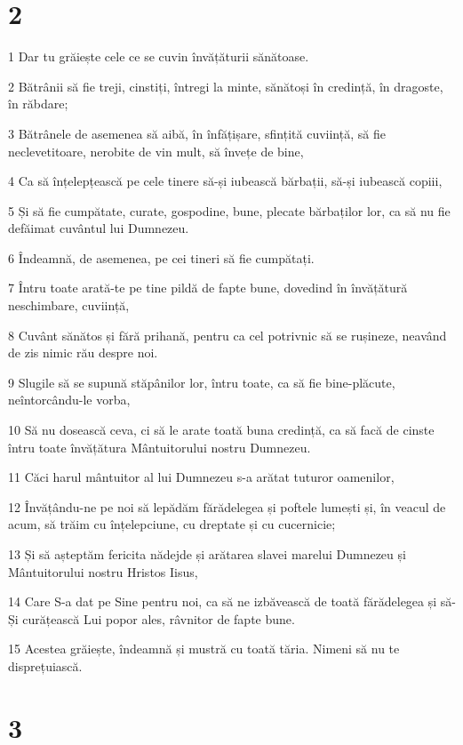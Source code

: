 \chapter{2}

\par 1 Dar tu grăiește cele ce se cuvin învățăturii sănătoase.
\par 2 Bătrânii să fie treji, cinstiți, întregi la minte, sănătoși în credință, în dragoste, în răbdare;
\par 3 Bătrânele de asemenea să aibă, în înfățișare, sfințită cuviință, să fie neclevetitoare, nerobite de vin mult, să învețe de bine,
\par 4 Ca să înțelepțească pe cele tinere să-și iubească bărbații, să-și iubească copiii,
\par 5 Și să fie cumpătate, curate, gospodine, bune, plecate bărbaților lor, ca să nu fie defăimat cuvântul lui Dumnezeu.
\par 6 Îndeamnă, de asemenea, pe cei tineri să fie cumpătați.
\par 7 Întru toate arată-te pe tine pildă de fapte bune, dovedind în învățătură neschimbare, cuviință,
\par 8 Cuvânt sănătos și fără prihană, pentru ca cel potrivnic să se rușineze, neavând de zis nimic rău despre noi.
\par 9 Slugile să se supună stăpânilor lor, întru toate, ca să fie bine-plăcute, neîntorcându-le vorba,
\par 10 Să nu dosească ceva, ci să le arate toată buna credință, ca să facă de cinste întru toate învățătura Mântuitorului nostru Dumnezeu.
\par 11 Căci harul mântuitor al lui Dumnezeu s-a arătat tuturor oamenilor,
\par 12 Învățându-ne pe noi să lepădăm fărădelegea și poftele lumești și, în veacul de acum, să trăim cu înțelepciune, cu dreptate și cu cucernicie;
\par 13 Și să așteptăm fericita nădejde și arătarea slavei marelui Dumnezeu și Mântuitorului nostru Hristos Iisus,
\par 14 Care S-a dat pe Sine pentru noi, ca să ne izbăvească de toată fărădelegea și să-Și curățească Lui popor ales, râvnitor de fapte bune.
\par 15 Acestea grăiește, îndeamnă și mustră cu toată tăria. Nimeni să nu te disprețuiască.

\chapter{3}

